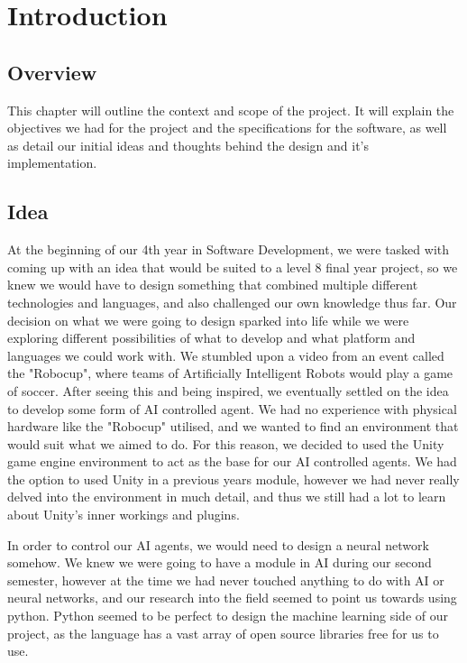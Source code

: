 
\chapter{Introduction}

\section{Overview}
This chapter will outline the context and scope of the project. It will explain the objectives we had for the project and the specifications for the software, as well as detail our initial ideas and thoughts behind the design and it's implementation. 

\section{Idea}
At the beginning of our 4th year in Software Development, we were tasked with coming up with an idea that would be suited to a level 8 final year project, so we knew we would have to design something that combined multiple different technologies and languages, and also challenged our own knowledge thus far. Our decision on what we were going to design sparked into life while we were exploring different possibilities of what to develop and what platform and languages we could work with. We stumbled upon a video from an event called the "Robocup", where teams of Artificially Intelligent Robots would play a game of soccer. After seeing this and being inspired, we eventually settled on the idea to develop some form of AI controlled agent. We had no experience with physical hardware like the "Robocup" utilised, and we wanted to find an environment that would suit what we aimed to do. For this reason, we decided to used the Unity game engine environment to act as the base for our AI controlled agents. We had the option to used Unity in a previous years module, however we had never really delved into the environment in much detail, and thus we still had a lot to learn about Unity's inner workings and plugins.

In order to control our AI agents, we would need to design a neural network somehow. We knew we were going to have a module in AI during our second semester, however at the time we had never touched anything to do with AI or neural networks, and our research into the field seemed to point us towards using python. Python seemed to be perfect to design the machine learning side of our project, as the language has a vast array of open source libraries free for us to use.

